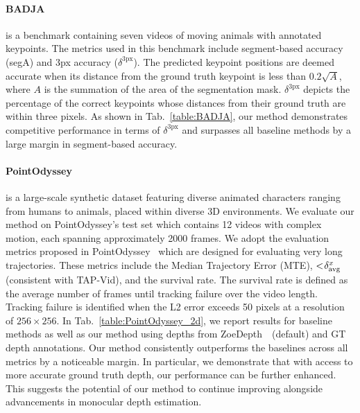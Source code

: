 \vspace{-1em}


\paragraph{\textbf{BADJA}~\cite{BADJA}} is a benchmark containing seven videos of moving animals with annotated keypoints. The metrics used in this benchmark include segment-based accuracy (segA) and 3px accuracy ($\delta^{\text{3px}}$). The predicted keypoint positions are deemed accurate when its distance from the ground truth keypoint is less than $0.2\sqrt{A}$, where $A$ is the summation of the area of the segmentation mask. $\delta^{\text{3px}}$ depicts the percentage of the correct keypoints whose distances from their ground truth are within three pixels. As shown in Tab.~\ref{table:BADJA}, our method demonstrates competitive performance in terms of $\delta^{\text{3px}}$ and surpasses all baseline methods by a large margin in segment-based accuracy.






\paragraph{\textbf{PointOdyssey}~\cite{zheng2023pointodyssey}} is a large-scale synthetic dataset featuring diverse animated characters ranging from humans to animals, placed within diverse 3D environments.
We evaluate our method on PointOdyssey's test set which contains 12 videos with complex motion, each spanning approximately 2000 frames.
We adopt the evaluation metrics proposed in PointOdyssey~\cite{zheng2023pointodyssey} which are designed for evaluating very long trajectories. These metrics include the Median Trajectory Error (MTE), $<\hspace{-0.2em}\delta_{\text{avg}}^{x}$ (consistent with TAP-Vid), and the survival rate. The survival rate is defined as the average number of frames until tracking failure over the video length. Tracking failure is identified when the L2 error exceeds 50 pixels at a resolution of $256\times256$. In Tab.~\ref{table:PointOdyssey_2d}, we report results for baseline methods as well as our method using depths from  ZoeDepth~\cite{ZoeDepth}~(default) and GT depth annotations.
Our method consistently outperforms the baselines across all metrics by a noticeable margin. In particular, we demonstrate that with access to more accurate ground truth depth, our performance can be further enhanced. This suggests the potential of our method to continue improving alongside advancements in monocular depth estimation.

